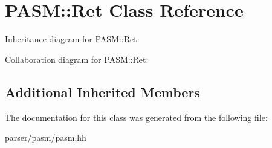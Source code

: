 \hypertarget{classPASM_1_1Ret}{}\section{P\+A\+SM\+:\+:Ret Class Reference}
\label{classPASM_1_1Ret}


Inheritance diagram for P\+A\+SM\+:\+:Ret\+:


Collaboration diagram for P\+A\+SM\+:\+:Ret\+:
\subsection*{Additional Inherited Members}


The documentation for this class was generated from the following file\+:\begin{DoxyCompactItemize}
\item 
parser/pasm/pasm.\+hh\end{DoxyCompactItemize}
